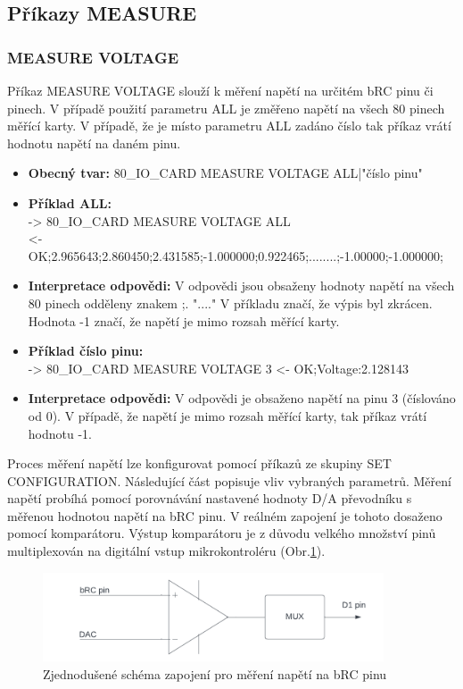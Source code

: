 \subsection{Příkazy MEASURE}
\subsubsection{MEASURE VOLTAGE}
Příkaz MEASURE VOLTAGE slouží k měření napětí na určitém bRC pinu či pinech. V případě použití parametru ALL je změřeno napětí na všech 80 pinech měřící karty.
V případě, že je místo parametru ALL zadáno číslo tak příkaz vrátí hodnotu napětí na daném pinu.\\

\begin{itemize}[leftmargin=*]
    \item \textbf{Obecný tvar:} 80\_IO\_CARD MEASURE VOLTAGE ALL|"číslo pinu"
    \item \textbf{Příklad ALL:}\\
    -> 80\_IO\_CARD MEASURE VOLTAGE ALL\\
    <- OK;2.965643;2.860450;2.431585;-1.000000;0.922465;........;-1.00000;-1.000000;
    \item \textbf{Interpretace odpovědi:} V odpovědi jsou obsaženy hodnoty napětí na všech 80 pinech odděleny znakem ;. "...." V příkladu značí, že výpis byl zkrácen.
    Hodnota -1 značí, že napětí je mimo rozsah měřící karty.

    \item \textbf{Příklad číslo pinu:}\\
    -> 80\_IO\_CARD MEASURE VOLTAGE 3
    <- OK;Voltage:2.128143\\
    \item \textbf{Interpretace odpovědi:} V odpovědi je obsaženo napětí na pinu 3 (číslováno od 0). V případě, že napětí je mimo rozsah měřící karty, tak příkaz vrátí hodnotu -1.
\end{itemize}

Proces měření napětí lze konfigurovat pomocí příkazů ze skupiny SET CONFIGURATION. Následující část popisuje vliv vybraných parametrů.
Měření napětí probíhá pomocí porovnávání nastavené hodnoty D/A převodníku s měřenou hodnotou napětí na bRC pinu. V reálném zapojení je tohoto dosaženo pomocí komparátoru.
Výstup komparátoru je z důvodu velkého množství pinů multiplexován na digitální vstup mikrokontroléru (Obr.\ref{fig: bRC pin voltage measurement}). 

\begin{figure}[ht!]
    \centering
    \includegraphics[width = 0.9\textwidth]{obrazky/Voltage_measurement_example.png}
    \caption{Zjednodušené schéma zapojení pro měření napětí na bRC pinu}
    \label{fig: bRC pin voltage measurement}
\end{figure}

